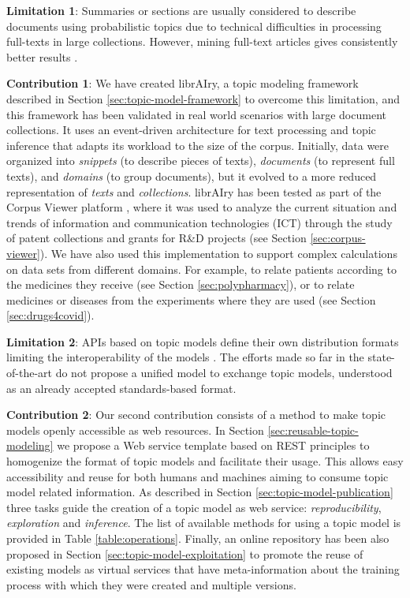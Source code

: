\textbf{Limitation 1}: Summaries or sections are usually considered to describe documents using probabilistic topics due to technical difficulties in processing full-texts in large collections. However, mining full-text articles gives consistently better results \citep{Westergaard2017}.

\textbf{Contribution 1}: We have created librAIry, a topic modeling framework described in Section \ref{sec:topic-model-framework} to overcome this limitation, and this framework has been validated in real world scenarios with large document collections. It uses an event-driven architecture for text processing and topic inference that adapts its workload to the size of the corpus. Initially, data were organized into \textit{snippets} (to describe pieces of texts), \textit{documents} (to represent full texts), and \textit{domains} (to group documents), but it  evolved to a more reduced representation of \textit{texts} and \textit{collections}. librAIry has been tested as part of the Corpus Viewer platform \citep{Samy2019}, where it was used to analyze the current situation and trends of information and communication technologies (ICT) through the study of patent collections and grants for R\&D projects (see Section \ref{sec:corpus-viewer}). We have also used this implementation to support complex calculations on data sets from different domains. For example, to relate patients according to the medicines they receive \citep{Badenes-Olmedo2019c} (see Section 	\ref{sec:polypharmacy}), or to relate medicines or diseases from the experiments where they are used (see Section \ref{sec:drugs4covid}). 


\textbf{Limitation 2}: APIs based on topic models define their own distribution formats limiting the interoperability of the models \citep{Lisena:NLPOSS2020}. The efforts made so far in the state-of-the-art do not propose a unified model to exchange topic models, understood as an already accepted standards-based format.

\textbf{Contribution 2}: Our second contribution consists of a method to make topic models openly accessible as web resources. In Section \ref{sec:reusable-topic-modeling} we propose a Web service template based on REST principles to homogenize the format of topic models and facilitate their usage. This allows easy accessibility and reuse for both humans and machines aiming to consume topic model related information. As described in Section \ref{sec:topic-model-publication} three tasks guide the creation of a topic model as web service: \textit{reproducibility}, \textit{exploration} and \textit{inference}. The list of available methods for using a topic model is provided in Table \ref{table:operations}. Finally, an online repository has been also proposed in Section \ref{sec:topic-model-exploitation} to promote the reuse of existing models as virtual services that have meta-information about the training process with which they were created and multiple versions. 

